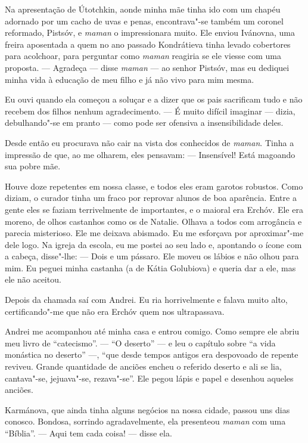Na apresentação de Útotchkin, aonde minha mãe tinha ido com um chapéu
adornado por um cacho de uvas e penas, encontrava"-se também um coronel
reformado, Pistsóv, e \emph{maman} o impressionara muito. Ele enviou
Ivánovna, uma freira aposentada a quem no ano passado Kondrátieva tinha
levado cobertores para acolchoar, para perguntar como \emph{maman}
reagiria se ele viesse com uma proposta. --- Agradeça --- disse
\emph{maman} --- ao senhor Pistsóv, mas eu dediquei minha vida à
educação de meu filho e já não vivo para mim mesma.

Eu ouvi quando ela começou a soluçar e a dizer que os pais sacrificam
tudo e não recebem dos filhos nenhum agradecimento. --- É muito difícil
imaginar --- dizia, debulhando"-se em pranto --- como pode ser ofensiva a
insensibilidade deles.

Desde então eu procurava não cair na vista dos conhecidos de
\emph{maman}. Tinha a impressão de que, ao me olharem, eles pensavam:
--- Insensível! Está magoando sua pobre mãe.

Houve doze repetentes em nossa classe, e todos eles eram garotos
robustos. Como diziam, o curador tinha um fraco por reprovar alunos de
boa aparência. Entre a gente eles se faziam terrivelmente de
importantes, e o maioral era Erchóv. Ele era moreno, de olhos castanhos
como os de Natalie. Olhava a todos com arrogância e parecia misterioso.
Ele me deixava abismado. Eu me esforçava por aproximar"-me dele logo. Na
igreja da escola, eu me postei ao seu lado e, apontando o ícone com a
cabeça, disse"-lhe: --- Dois e um pássaro. Ele moveu os lábios e não
olhou para mim. Eu peguei minha castanha (a de Kátia Golubiova) e queria
dar a ele, mas ele não aceitou.

Depois da chamada saí com Andrei. Eu ria horrivelmente e falava muito
alto, certificando"-me que não era Erchóv quem nos ultrapassava.

Andrei me acompanhou até minha casa e entrou comigo. Como sempre ele
abriu meu livro de ``catecismo''. --- ``O deserto'' --- e leu o capítulo
sobre ``a vida monástica no deserto'' ---, ``que desde tempos antigos
era despovoado de repente reviveu. Grande quantidade de anciões encheu o
referido deserto e ali se lia, cantava"-se, jejuava"-se, rezava"-se''. Ele
pegou lápis e papel e desenhou aqueles anciões.

Karmánova, que ainda tinha alguns negócios na nossa cidade, passou uns
dias conosco. Bondosa, sorrindo agradavelmente, ela presenteou
\emph{maman} com uma ``Bíblia''. --- Aqui tem cada coisa! --- disse ela.


